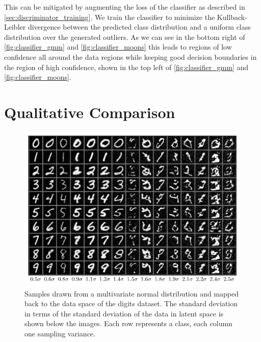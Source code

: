 This can be mitigated by augmenting the loss of the classifier as described in
\autoref{sec:discriminator_training}. We train the classifier to minimize the
Kullback-Leibler divergence between the predicted class distribution and a
uniform class distribution over the generated outliers. As we can see in the
bottom right of \autoref{fig:classifier_gmm} and \autoref{fig:classifier_moons}
this leads to regions of low confidence all around the data regions while
keeping good decision boundaries in the region of high confidence, shown in the
top left of \autoref{fig:classifier_gmm} and \autoref{fig:classifier_moons}.

\section{Qualitative Comparison}%
\label{sec:qualitative_comparison}

\begin{figure}[htpb]
	\centering
        \includegraphics{figures/samples/samples_increasing_distance_EMNIST.pdf}
	\caption{Samples drawn from a multivariate normal distribution and
		mapped back to the data space of the digits dataset. The standard
		deviation in terms of the standard deviation of the data in latent
		space is shown below the images. Each row represents a class, each
		column one sampling variance.}%
	\label{fig:emnist_sample_sigma}
\end{figure}

